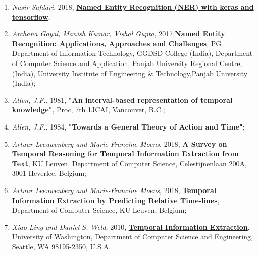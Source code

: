 \documentclass{report}
\begin{document}
\begin{enumerate}
\item \textit{Nasir Safdari}, 2018, \href{https://towardsdatascience.com/named-entity-recognition-ner-meeting-industrys-requirement-by-applying-state-of-the-art-deep-698d2b3b4ede}{\textbf{Named Entity Recognition (NER) with keras and tensorflow}};

\item \textit{Archana Goyal, Manish Kumar, Vishal Gupta}, 2017,\href{https://pdfs.semanticscholar.org/2060/5fdae23f6e8d945deb22e09c46cecebb4f35.pdf}{\textbf{Named Entity Recognition: Applications, Approaches and Challenges}}, PG Department of Information Technology, GGDSD College (India), Department of Computer Science and Application, Panjab University Regional Centre, (India), University Institute of Engineering \& Technology,Panjab University (India);

\item \textit{Allen, J.F.}, 1981, \textbf{"An interval-based representation of temporal knowledge"}, Proc, 7th 1JCAI, Vancouver, B.C.;

\item \textit{Allen, J.F.}, 1984, \textbf{"Towards a General Theory of Action and Time"};

\item \textit{Artuur Leeuwenberg and Marie-Francine Moens}, 2018, \textbf{A Survey on Temporal Reasoning for Temporal Information Extraction from Text}, KU Leuven, Department of Computer Science, Celestijnenlaan 200A, 3001 Heverlee, Belgium;

\item \textit{Artuur Leeuwenberg and Marie-Francine Moens}, 2018, \href{https://aclweb.org/anthology/D18-1155}{\textbf{Temporal Information Extraction by Predicting Relative Time-lines}}, Department of Computer Science, KU Leuven, Belgium;

\item \textit{Xiao Ling and Daniel S. Weld}, 2010, \href{https://homes.cs.washington.edu/~weld/papers/ling-aaai10.pdf}{\textbf{Temporal Information Extraction}}, University of Washington, Department of Computer Science and Engineering, Seattle, WA 98195-2350, U.S.A.
\end{enumerate}
\end{document}
